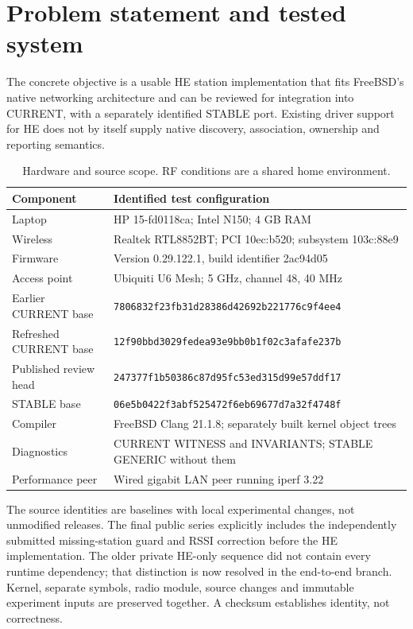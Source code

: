 \documentclass[11pt,letterpaper,oneside]{article}
\newcommand{\code}[1]{\texttt{\small #1}}
\begin{document}
\section{Problem statement and tested system}
The concrete objective is a usable HE station implementation that fits FreeBSD's native networking architecture and can be reviewed for integration into CURRENT, with a separately identified STABLE port. Existing driver support for HE does not by itself supply native discovery, association, ownership and reporting semantics.

\begin{table}[H]\small\centering
\begin{tabularx}{\linewidth}{lY}\toprule
Component & Identified test configuration\\\midrule
Laptop & HP 15-fd0118ca; Intel N150; 4 GB RAM\\
Wireless & Realtek RTL8852BT; PCI 10ec:b520; subsystem 103c:88e9\\
Firmware & Version 0.29.122.1, build identifier 2ac94d05\\
Access point & Ubiquiti U6 Mesh; 5 GHz, channel 48, 40 MHz\\
Earlier CURRENT base & \code{7806832f23fb31d28386d42692b221776c9f4ee4}\\
Refreshed CURRENT base & \code{12f90bbd3029fedea93e9bb0b1f02c3afafe237b}\\
Published review head & \code{247377f1b50386c87d95fc53ed315d99e57ddf17}\\
STABLE base & \code{06e5b0422f3abf525472f6eb69677d7a32f4748f}\\
Compiler & FreeBSD Clang 21.1.8; separately built kernel object trees\\
Diagnostics & CURRENT WITNESS and INVARIANTS; STABLE GENERIC without them\\
Performance peer & Wired gigabit LAN peer running iperf 3.22\\\bottomrule
\end{tabularx}\caption{Hardware and source scope. RF conditions are a shared home environment.}\end{table}
The source identities are baselines with local experimental changes, not unmodified releases. The final public series explicitly includes the independently submitted missing-station guard and RSSI correction before the HE implementation. The older private HE-only sequence did not contain every runtime dependency; that distinction is now resolved in the end-to-end branch. Kernel, separate symbols, radio module, source changes and immutable experiment inputs are preserved together. A checksum establishes identity, not correctness.
\end{document}
